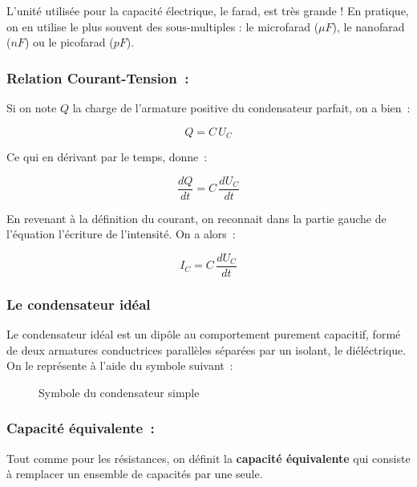 L'unité utilisée pour la capacité électrique, le farad, est très grande ! En pratique, on en utilise le plus souvent des sous-multiples : le microfarad ($\mu F$), le nanofarad ($nF$) ou le picofarad ($pF$). 


\subsubsection{Relation Courant-Tension~: }

Si on note $Q$ la charge de l'armature positive du condensateur parfait, on a bien~:

$$Q = C\,U_C$$

Ce qui en dérivant par le temps, donne~:

$$\dfrac{dQ}{dt} = C\,\dfrac{dU_C}{dt}$$

En revenant à la définition du courant, on reconnait dans la partie gauche de l'équation l'écriture de l'intensité. On a alors~:

\begin{equation}
	I_C = C\,\dfrac{dU_C}{dt}
\end{equation}

\subsubsection{Le condensateur idéal}

Le condensateur idéal est un dipôle au comportement purement capacitif, formé de deux armatures conductrices parallèles séparées par un isolant, le diéléctrique. On le représente à l'aide du symbole suivant~:

\begin{figure}[!h]
\centering

\caption{Symbole du condensateur simple}
\end{figure}

\subsubsection{Capacité équivalente~: }

Tout comme pour les résistances, on définit la \textbf{capacité équivalente} qui consiste à remplacer un ensemble de capacités par une seule.\\ 

